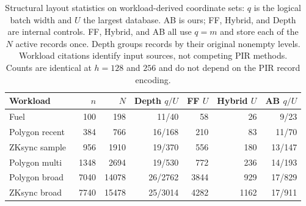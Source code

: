 \begin{table}[t]
\centering\small
\caption{Structural layout statistics on workload-derived coordinate sets: $q$ is the logical batch width and $U$ the largest database. AB is ours; FF, Hybrid, and Depth are internal controls. FF, Hybrid, and AB all use $q=m$ and store each of the $N$ active records once. Depth groups records by their original nonempty levels. Workload citations identify input sources, not competing PIR methods. Counts are identical at $h=128$ and $256$ and do not depend on the PIR record encoding.}
\label{tab:real_workload_shape}
\setlength{\tabcolsep}{5pt}
\begin{tabular}{lrrrrrr}
\toprule
Workload & $n$ & $N$ & Depth $q/U$ & FF $U$ & Hybrid $U$ & AB $q/U$\\
\midrule
Fuel~\cite{fuelsmtgen} & 100 & 198 & 11/40 & 58 & 26 & 9/23\\
Polygon recent~\cite{polygonzkevm} & 384 & 766 & 16/168 & 210 & 83 & 11/70\\
ZKsync sample~\cite{zksyncdocs} & 956 & 1910 & 19/370 & 556 & 180 & 13/147\\
Polygon multi~\cite{polygonzkevm} & 1348 & 2694 & 19/530 & 772 & 236 & 14/193\\
Polygon broad~\cite{polygonzkevm} & 7040 & 14078 & 26/2762 & 3844 & 929 & 17/829\\
ZKsync broad~\cite{zksyncdocs} & 7740 & 15478 & 25/3014 & 4282 & 1162 & 17/911\\
\bottomrule
\end{tabular}
\end{table}
